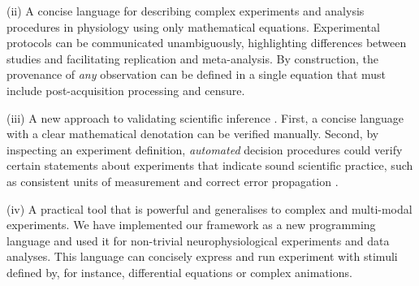 (ii) A concise language for describing complex experiments and
analysis procedures in physiology using only mathematical
equations. Experimental protocols can be communicated unambiguously,
highlighting differences between studies and facilitating replication
and meta-analysis.  By construction, the provenance
\cite{Pool2002,MacKenzie-Graham2008, VanHorn2009} of \emph{any}
observation can be defined in a single equation that must include
post-acquisition processing and censure.

(iii) A new approach to validating scientific inference
\cite{Editors2003, Editors2010}. First, a concise language with a
clear mathematical denotation can be verified manually. Second, by
inspecting an experiment definition, \emph{automated} decision procedures
could verify certain statements about experiments that indicate sound
scientific practice, such as consistent units of measurement
\cite{Kennedy1997} and correct error propagation \cite{Taylor1997}.

(iv) A practical tool that is powerful and generalises to complex and
multi-modal experiments. We have implemented our framework as a new
programming language and used it for non-trivial neurophysiological
experiments and data analyses. This language can concisely express and
run experiment with stimuli defined by, for instance, differential
equations or complex animations.
